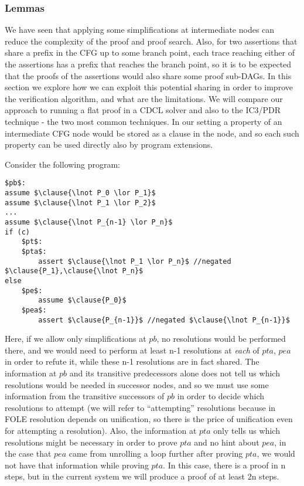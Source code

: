 \subsubsection{Lemmas}
We have seen that applying some simplifications at intermediate nodes can reduce the complexity of the proof and proof search. 
Also, for two assertions that share a prefix in the CFG up to some branch point, each trace reaching either of the assertions has a prefix that reaches the branch point, so it is to be expected that the proofs of the assertions would also share some proof sub-DAGs.
In this section we explore how we can exploit this potential sharing in order to improve the verification algorithm, and what are the limitations.
We will compare our approach to running a flat proof in a CDCL solver and also to the IC3/PDR technique - the two most common techniques.
In our setting a property of an intermediate CFG node would be stored as a clause in the node, and so each such property can be used directly also by program extensions.

Consider the following program:
\begin{lstlisting}[mathescape]
$pb$: 
assume $\clause{\lnot P_0 \lor P_1}$
assume $\clause{\lnot P_1 \lor P_2}$
...
assume $\clause{\lnot P_{n-1} \lor P_n}$
if (c)
	$pt$:
	$pta$:
		assert $\clause{\lnot P_1 \lor P_n}$ //negated $\clause{P_1},\clause{\lnot P_n}$
else
	$pe$:
		assume $\clause{P_0}$
	$pea$:
		assert $\clause{P_{n-1}}$ //negated $\clause{\lnot P_{n-1}}$
\end{lstlisting}

Here, if we allow only simplifications at $pb$, no resolutions would be performed there, and we would need to perform at least n-1 resolutions at \emph{each} of $pta$, $pea$ in order to refute it, while these n-1 resolutions are in fact shared.
The information at $pb$ and its transitive predecessors alone does not tell us which resolutions would be needed in successor nodes, and so we must use some information from the transitive successors of $pb$ in order to decide which resolutions to attempt (we will refer to ``attempting'' resolutions because in FOLE resolution depends on unification, so there is the price of unification even for attempting a resolution).
Also, the information at $pta$ only tells us which resolutions might be necessary in order to prove $pta$ and no hint about $pea$, in the case that $pea$ came from unrolling a loop further after proving $pta$, we would not have that information while proving $pta$.
In this case, there is a proof in n steps, but in the current system we will produce a proof of at least 2n steps.

